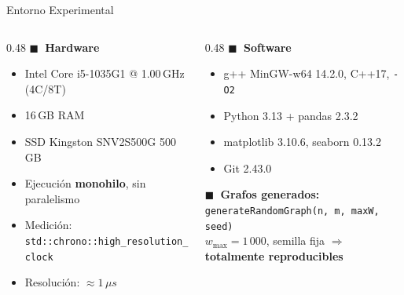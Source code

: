 \documentclass[aspectratio=169,12pt]{beamer}
\begin{document}
\begin{frame}{Entorno Experimental}
  \begin{columns}[T]
    \begin{column}{0.48\textwidth}
      \textbf{$\blacksquare$~Hardware}
      \begin{itemize}\small
        \item Intel Core i5-1035G1 @ 1.00\,GHz (4C/8T)
        \item 16\,GB RAM
        \item SSD Kingston SNV2S500G 500\,GB
        \item Ejecución \textbf{monohilo}, sin paralelismo
        \item Medición: \texttt{std::chrono::high\_resolution\_clock}
        \item Resolución: $\approx 1\,\mu s$
      \end{itemize}
    \end{column}
    \begin{column}{0.48\textwidth}
      \textbf{$\blacksquare$~Software}
      \begin{itemize}\small
        \item g++ MinGW-w64 14.2.0, C++17, \texttt{-O2}
        \item Python 3.13 + pandas 2.3.2
        \item matplotlib 3.10.6, seaborn 0.13.2
        \item Git 2.43.0
      \end{itemize}
      \vspace{0.2cm}
      \textbf{$\blacksquare$~Grafos generados:}\\
      \small
      \texttt{generateRandomGraph(n, m, maxW, seed)}\\
      $w_{\max}=1\,000$, semilla fija $\Rightarrow$ \textbf{totalmente reproducibles}
    \end{column}
  \end{columns}
\end{frame}
\end{document}
